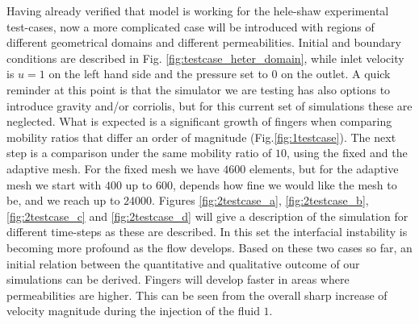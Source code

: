 \documentclass[preprint,authoryear,12pt]{elsarticle}
\begin{document}
\medskip
Having already verified that model is working for the hele-shaw experimental test-cases, now a more complicated case will be introduced with regions of different geometrical domains and different permeabilities. Initial and boundary conditions are described in Fig. \ref{fig:testcase_heter_domain}, while inlet velocity is $u=1$ on the left hand side and the pressure set to $0$ on the outlet. A quick reminder at this point is that the simulator we are testing has also options to introduce gravity and/or corriolis, but for this current set of simulations these are neglected. What is expected is a significant growth of fingers when comparing mobility ratios that differ an order of magnitude (Fig.\ref{fig:1testcase}). The next step is a comparison under the same mobility ratio of $10$, using the fixed and the adaptive mesh. For the fixed mesh we have $4600$ elements, but for the adaptive mesh we start with $400$ up to $600$, depends how fine we would like the mesh to be, and we reach up to $24000$. %
Figures \ref{fig:2testcase_a}, \ref{fig:2testcase_b}, \ref{fig:2testcase_c} and \ref{fig:2testcase_d} will give a description of the simulation for different time-steps as these are described. In this set the interfacial instability is becoming more profound as the flow develops. Based on these two cases so far, an initial relation between the quantitative and qualitative outcome of our simulations can be derived. Fingers will develop faster in areas where permeabilities are higher. This can be seen from the overall sharp increase of velocity magnitude during the injection of the fluid $1$.    
\end{document}
